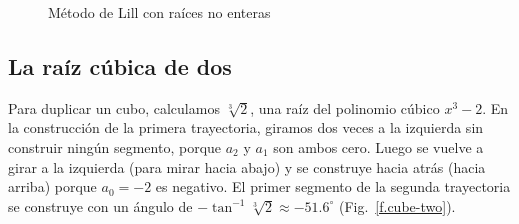 \begin{figure}[t]
\begin{center}
\end{center}
\caption{Método de Lill con raíces no enteras}\label{f.noninteger}
\end{figure}

\subsection{La raíz cúbica de dos}\label{s.cube}
Para duplicar un cubo, calculamos $\sqrt[3]{2}$, una raíz del polinomio cúbico $x^3-2$. En la construcción de la primera trayectoria, giramos dos veces a la izquierda sin construir ningún segmento, porque $a_2$ y $a_1$ son ambos cero. Luego se vuelve a girar a la izquierda (para mirar hacia abajo) y se construye hacia atrás (hacia arriba) porque $a_0=-2$ es negativo. El primer segmento de la segunda trayectoria se construye con un ángulo de $-\tan^{-1} \sqrt[3]{2}\approx -51.6^\circ$ (Fig.~\ref{f.cube-two}).

